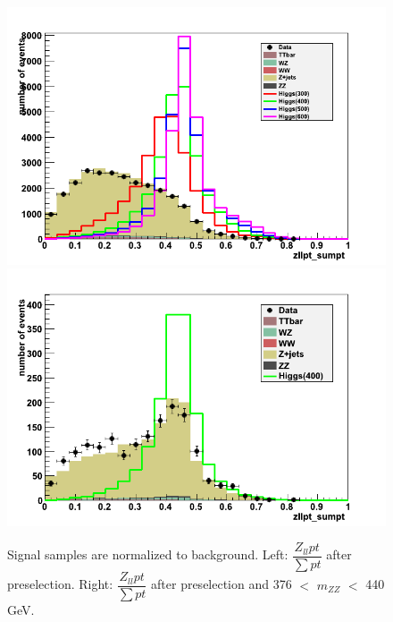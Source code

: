 

\begin{figure}[htb!]
\begin{center}
\centerline{
\includegraphics[width=0.5\linewidth]{Optimization/plots/NN/zllpt_sumpt.png}
\includegraphics[width=0.5\linewidth]{Optimization/plots/NN/zllpt_sumpt_window.png}
}
\caption{
Signal samples are normalized to background. Left: $\dfrac{Z_{ll}pt}{\sum{pt}}$ after preselection.  Right: $\dfrac{Z_{ll}pt}{\sum{pt}}$ after preselection and 376 $<$ $m_{ZZ}$ $<$ 440 GeV.
}
\label{fig:zllptzumpt}
\end{center}
\end{figure}


